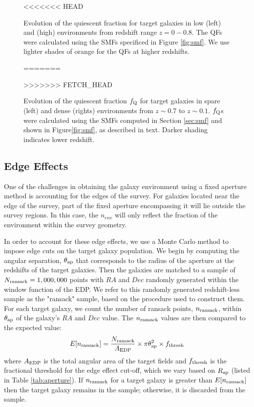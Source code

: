 \documentclass{emulateapj}
\begin{document}
\begin{figure*}
    \begin{center}
        \leavevmode
<<<<<<< HEAD
        \label{fig:smf}
        \caption{Evolution of the quiescent fraction for target galaxies in low (left) and (high) environments
from redshift range $z=0-0.8$. The QFs were calculated using the SMFs specificed in Figure \ref{fig:smf}. We use
lighter shades of orange for the QFs at higher redshifts.}
=======
        \caption{Evolution of the quiescent fraction $f_{\rm{Q}}$ for target galaxies in spare (left) and dense (rights) environments
from $z \sim 0.7$ to $z \sim 0.1$. $f_{\rm{Q}}$s were calculated using the SMFs computed in Section \ref{sec:smf} and shown in Figure\ref{fig:smf}, as described in text. Darker shading indicates lower redshift.}         \label{fig:qf}
>>>>>>> FETCH_HEAD
    \end{center}
\end{figure*}

\subsection{Edge Effects} \label{sec:edgeeffect}
One of the challenges in obtaining the galaxy environment using a fixed aperture method is accounting for the edges of the survey.
For galaxies located near the edge of the survey, part of the fixed aperture encompassing it will lie outside the survey regions. 
In this case, the $n_{env}$ will only reflect the fraction of the environment within the survey geometry.

In order to account for these edge effects, we use a Monte Carlo method to impose edge cuts on the target 
galaxy population. 
We begin by computing the angular separation, $\theta_{\rm{ap}}$ that corresponds to the radius of the 
aperture at the redshifts of the target galaxies.
Then the galaxies are matched to a sample of $N_{\rm{ransack}}=1,000,000$ points with $RA$ and $Dec$
 randomly generated within the window function of the EDP.  
We refer to this randomly generated redshift-less sample as the "ransack" sample, based on the procedure 
used to construct them. 
For each target galaxy, we count the number of ransack points, $n_{\rm{ransack}}$, within $\theta_{\rm{ap}}$
of the galaxy's $RA$ and $Dec$ value.
The $n_{\rm{ransack}}$ values are then compared to the expected value:
\begin{equation} \label{eq:ransack}
E[n_{\rm{ransack}}] = \frac{N_{\rm{ransack}}}{A_{\rm{EDP}}}\times {\pi \theta_{\rm{ap}}^2} \times f_{\rm{thresh}} 
\end{equation} 
where $A_{\rm{EDP}}$ is the total angular area of the target fields and $f_{\rm{thresh}}$ is the fractional 
threshold for the edge effect cut-off, which we vary based on $R_{\rm{ap}}$ (listed in Table \ref{tab:aperture}).
If $n_{\rm{ransack}}$ for a target galaxy is greater than $E[n_{\rm{ransack}}]$ then the target galaxy remains
in the sample; otherwise, it is discarded from the sample. 
\end{document}
